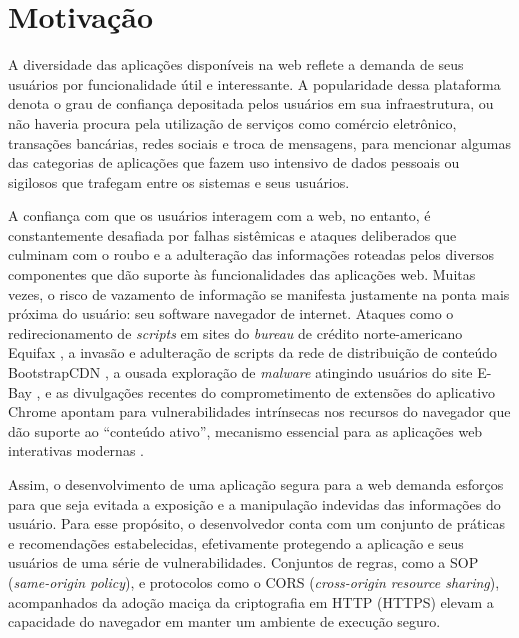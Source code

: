 \section{Motivação}

A diversidade das aplicações disponíveis na web reflete a demanda de seus usuários por funcionalidade útil e interessante. A popularidade dessa plataforma denota o grau de confiança depositada pelos usuários em sua infraestrutura, ou não haveria procura pela utilização de serviços como comércio eletrônico, transações bancárias, redes sociais e troca de mensagens, para mencionar algumas das categorias de aplicações que fazem uso intensivo de dados pessoais ou sigilosos que trafegam entre os sistemas e seus usuários.

A confiança com que os usuários interagem com a web, no entanto, é constantemente desafiada por falhas sistêmicas e ataques deliberados que culminam com o roubo e a adulteração das informações roteadas pelos diversos componentes que dão suporte às funcionalidades das aplicações web. Muitas vezes, o risco de vazamento de informação se manifesta justamente na ponta mais próxima do usuário: seu software navegador de internet. Ataques como o redirecionamento de \textit{scripts} em sites do \textit{bureau} de crédito norte-americano Equifax \cite{Segura2017}, a invasão e adulteração de scripts da rede de distribuição de conteúdo BootstrapCDN \cite{Dorfman2013}, a ousada exploração de \textit{malware} atingindo usuários do site E-Bay \cite{Vanunu2016}, e as divulgações recentes do comprometimento de extensões do aplicativo Chrome \cite{Forrest2017} apontam para vulnerabilidades intrínsecas nos recursos do navegador que dão suporte ao ``conteúdo ativo'', mecanismo essencial para as aplicações web interativas modernas \cite{Hedin2016}.

Assim, o desenvolvimento de uma aplicação segura para a web demanda esforços para que seja evitada a exposição e a manipulação indevidas das informações do usuário. Para esse propósito, o desenvolvedor conta com um conjunto de práticas e recomendações estabelecidas, efetivamente protegendo a aplicação e seus usuários de uma série de vulnerabilidades. Conjuntos de regras, como a SOP (\textit{same-origin policy}), e protocolos como o CORS (\textit{cross-origin resource sharing}), acompanhados da adoção maciça da criptografia em HTTP (HTTPS) elevam a capacidade do navegador em manter um ambiente de execução seguro.

